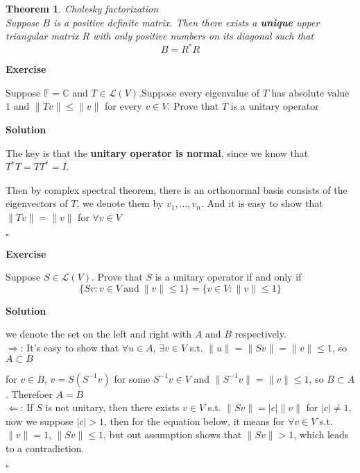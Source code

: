 \documentclass{article}
\newtheorem{theorem}{Theorem}[subsection]
\newenvironment{exercise}{%
{\textbf{Exercise\\}
    }
}{
}
\newenvironment{solution}{%
{
    \textbf{Solution\\}
    }
}{
  \hfill $\square$ 
  \par\bigskip 
}
\newcommand{\CC}{\mathbb{C}}
\newcommand{\FF}{\mathbb{F}}
\begin{document}
\begin{CJK}{UTF8}{gkai}
\begin{theorem}
    Cholesky factorization\\

    Suppose $B$ is a positive definite matrix. Then there exists a \textbf{unique} upper triangular matrix $R$ with only positive numbers on its diagonal such that
    \[B =R^\ast R\]
\end{theorem}

\begin{exercise}
    Suppose $\FF = \CC$ and $T \in \mathcal{L}(V)$.Suppose every eigenvalue of $T$ has absolute value $1$ and $\|Tv\| \leq \|v\|$ for every $v \in V$. Prove that $T$ is a unitary operator
\end{exercise}

\begin{solution}
    The key is that the \textbf{unitary operator is normal}, since we know that $T^\ast T = T T^\ast = I$.
    
    Then by complex spectral theorem, there is an orthonormal basis consists of the eigenvectors of $T$, we denote them by $v_1,\ldots,v_n$. And it is easy to show that $\|Tv\| = \|v\|$ for $\forall v \in V$
\end{solution}

\begin{exercise}
    Suppose $S \in \mathcal{L}(V)$. Prove that $S$ is a unitary operator if and only if
    \[\{Sv : v \in V ~\text{and}~ \|v\| \leq 1\} = \{v \in V : \|v\| \leq 1\}\]
\end{exercise}

\begin{solution}
    we denote the set on the left and right with $A$ and $B$ respectively.\\

    $\Rightarrow$: It's easy to show that $\forall u \in A$, $\exists v \in V$ s.t. $\|u\| =\|S v\| = \|v\| \leq 1$, so $A \subset B$

    for $v \in B$, $v = S(S^{-1}v)$ for some $S^{-1}v \in V$ and $\|S^{-1}v\| = \|v\| \leq 1$, so $B \subset A$. Therefoer $A = B$\\

    $\Leftarrow$: If $S$ is not unitary, then there exists $v \in V$ s.t. $\|Sv\| = |c|\|v\|$ for $|c| \neq 1$, now we suppose $|c| > 1$, then for the equation below, it means for $\forall v \in V$ s.t. $\|v\| = 1$, $\|Sv\| \leq 1$, but out assumption shows that $\|Sv\| >1$, which leads to a contradiction.
\end{solution}


\end{CJK}
\end{document}
